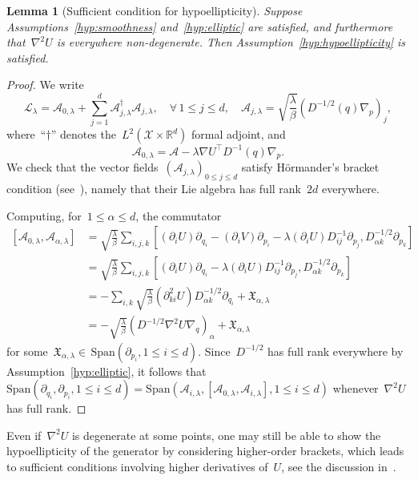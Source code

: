 \documentclass[10pt]{article}
\newcommand{\cL}{\mathcal{L}}
\newcommand{\R}{\mathbb{R}}
\newcommand{\cX}{\mathcal{X}}
\newcommand{\cA}{\mathcal{A}}
\newcommand{\cLham}{\mathcal A}
\newcommand{\1}{\mathbbm 1}
\newtheorem{lemma}{Lemma}
\begin{document}
\begin{lemma}[Sufficient condition for hypoellipticity]
    \label{lemma:hypoellipticity}
    Suppose Assumptions~\ref{hyp:smoothness} and~\ref{hyp:elliptic} are satisfied, and furthermore that~$\nabla^2 U$ is everywhere non-degenerate. Then Assumption~\ref{hyp:hypoellipticity} is satisfied.
\end{lemma}
\begin{proof}
    We write
    \begin{equation}
       \cL_\lambda = \cA_{0,\lambda} + \sum_{j=1}^d \cA_{j,\lambda}^\dagger \cA_{j,\lambda},\quad \forall\,1\leq j\leq d,\quad \cA_{j,\lambda} = \sqrt{\frac{\lambda}{\beta}}\left(D^{-1/2}(q)\nabla_p\right)_j,
    \end{equation}
    where~``$\dagger$'' denotes the~$L^2(\cX\times\R^d)$ formal adjoint, and
    \begin{equation}
    \cA_{0,\lambda}=\cLham -\lambda \nabla U^\top D^{-1}(q)\nabla_p.
    \end{equation}
    We check that the vector fields~$(\cA_{j,\lambda})_{0\leq j\leq d}$ satisfy H\"ormander's bracket condition (see~\cite{H67}), namely that their Lie algebra has full rank~$2d$ everywhere.

    Computing, for~$1\leq \alpha\leq d$, the commutator
    \begin{equation}
        \begin{aligned}
            \left[\cA_{0,\lambda},\cA_{\alpha,\lambda}\right] &= \sqrt{\frac{\lambda}{\beta}}\sum_{i,j,k} \left[(\partial_i U)\partial_{q_i}-\left(\partial_i V\right)\partial_{p_i}-\lambda\left(\partial_i U\right) D^{-1}_{ij}\partial_{p_j},D^{-1/2}_{\alpha k}\partial_{p_k}\right]\\
            &=\sqrt{\frac{\lambda}{\beta}}\sum_{i,j,k} \left[(\partial_i U)\partial_{q_i}-\lambda\left(\partial_i U\right) D^{-1}_{ij}\partial_{p_j},D^{-1/2}_{\alpha k}\partial_{p_k}\right]\\
            &=-\sum_{i,k}\sqrt{\frac{\lambda}{\beta}}(\partial^2_{ki}U)D^{-1/2}_{\alpha k}\partial_{q_i} + \mathfrak{X}_{\alpha,\lambda}\\
            &=-\sqrt{\frac{\lambda}{\beta}}\left(D^{-1/2}\nabla^2 U\nabla_q\right)_\alpha + \mathfrak{X}_{\alpha,\lambda}
        \end{aligned}
    \end{equation}
    for some~$\mathfrak{X}_{\alpha,\lambda}\in\,\mathrm{Span}(\partial_{p_i},1\leq i\leq d)$. Since~$D^{-1/2}$ has full rank everywhere by Assumption~\ref{hyp:elliptic}, it follows that~$\mathrm{Span}(\partial_{q_i},\partial_{p_i},1\leq i\leq d) = \mathrm{Span}(\cA_{i,\lambda},[\cA_{0,\lambda},\cA_{i,\lambda}],1\leq i\leq d)$ whenever~$\nabla^2 U$ has full rank.
\end{proof}
Even if~$\nabla^2 U$ is degenerate at some points, one may still be able to show the hypoellipticity of the generator by considering higher-order brackets, which leads to sufficient conditions involving higher derivatives of~$U$, see the discussion in~\cite[Appendix A]{BS25}.
\end{document}
